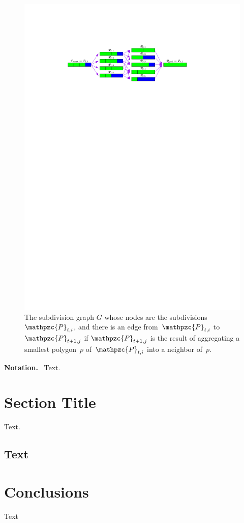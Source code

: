 \documentclass[graybox]{svmult}
\newcommand{\mypar}[1]{\bigskip\noindent\textbf{#1.}~}
\newcommand{\Pnode}{\ensuremath{\mathpzc{P}_{t,i}}\xspace}
\begin{document}
\begin{figure}[tb]
	\centering
	\includegraphics{SubdivisionName}
	\caption{The subdivision graph $G$ whose nodes are the
          subdivisions \Pnode, and there is an edge
          from~\Pnode to~$\mathpzc{P}_{t+1,j}$ if
          $\mathpzc{P}_{t+1,j}$ is the result of aggregating a
          smallest polygon~$p$ of~\Pnode into a neighbor
          of~$p$.}
	\label{fig:SubdivisionName}
\end{figure}

\mypar{Notation}
Text. 


\section{Section Title}
\label{sec:AStarAlgorithm}

Text.

\subsection{Text}
\label{sec:Formalizing}



\section{Conclusions}
\label{sec:Conclusions}

Text

\printbibliography
%
%
\end{document}
